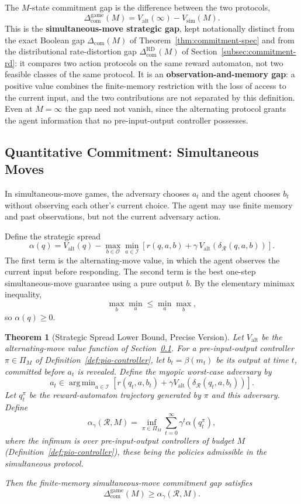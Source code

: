 \documentclass[12pt]{article}
\newtheorem{theorem}{Theorem}[section]
\theoremstyle{definition}
\DeclareMathOperator*{\argmin}{arg\,min}
\newcommand{\Com}{\Delta_{\mathrm{com}}}
\newcommand{\Comex}{\Com}
\newcommand{\ComRD}{\Delta_{\mathrm{com}}^{\mathrm{RD}}}
\newcommand{\ComGame}{\Delta_{\mathrm{com}}^{\mathrm{game}}}
\newcommand{\Valt}{V_{\mathrm{alt}}}
\newcommand{\Vsim}{V_{\mathrm{sim}}}
\begin{document}
The $M$-state commitment gap is the difference between the two protocols,
\[
\ComGame(M)=\Valt(\infty)-\Vsim(M).
\]
This is the \textbf{simultaneous-move strategic gap}, kept notationally
distinct from the exact Boolean gap $\Comex(M)$ of
Theorem~\ref{thm:commitment-spec} and from the distributional
rate-distortion gap $\ComRD(M)$ of Section~\ref{subsec:commitment-rd}: it
compares two action protocols on the same reward automaton, not two feasible
classes of the same protocol.  It is an \textbf{observation-and-memory gap}: a positive value combines the
finite-memory restriction with the loss of access to the current input, and
the two contributions are not separated by this definition.  Even at
$M=\infty$ the gap need not vanish, since the alternating protocol grants the
agent information that no pre-input-output controller possesses.

\subsection{Quantitative Commitment: Simultaneous Moves}
\label{subsec:quant-simul}

In simultaneous-move games, the adversary chooses $a_t$ and the agent chooses
$b_t$ without observing each other's current choice.  The agent may use finite
memory and past observations, but not the current adversary action.

Define the strategic spread
\[
\alpha(q)
=
\Valt(q)
-
\max_{b\in\mathcal O}
\min_{a\in\mathcal I}
\left[
r(q,a,b)+\gamma\,\Valt(\delta_{\mathcal R}(q,a,b))
\right].
\]
The first term is the alternating-move value, in which the agent observes the
current input before responding.  The second term is the best one-step
simultaneous-move guarantee using a pure output $b$.  By the elementary minimax
inequality,
\[
\max_b\min_a \le \min_a\max_b,
\]
so $\alpha(q)\ge0$.

\begin{theorem}[Strategic Spread Lower Bound, Precise Version]
\label{thm:strategic-spread}
Let $\Valt$ be the alternating-move value function of
Section~\ref{subsec:quant-simul}.
For a pre-input-output controller $\pi\in\Pi_M$ of
Definition~\ref{def:pio-controller}, let $b_t=\beta(m_t)$ be its output at
time $t$, committed before $a_t$ is revealed.  Define the myopic worst-case adversary by
\[
a_t
\in
\argmin_{a\in\mathcal I}
\left[
r(q_t,a,b_t)+\gamma \Valt(\delta_{\mathcal R}(q_t,a,b_t))
\right].
\]
Let $q_t^\pi$ be the reward-automaton trajectory generated by $\pi$ and this
adversary.  Define
\[
\alpha_\gamma(\mathcal R,M)
=
\inf_{\pi\in\Pi_M}
\sum_{t=0}^{\infty}
\gamma^t
\alpha(q_t^\pi),
\]
where the infimum is over pre-input-output controllers of budget $M$
(Definition~\ref{def:pio-controller}), these being the policies admissible in
the simultaneous protocol.

Then the finite-memory simultaneous-move commitment gap satisfies
\[
\ComGame(M)
\ge
\alpha_\gamma(\mathcal R,M).
\]
\end{theorem}
\end{document}
